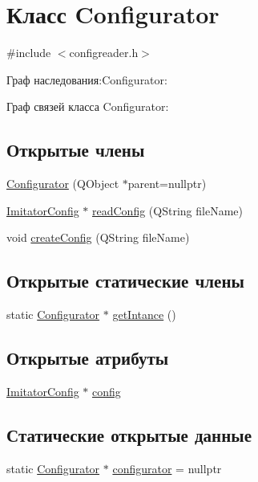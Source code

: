 \hypertarget{class_configurator}{}\section{Класс Configurator}
\label{class_configurator}


{\ttfamily \#include $<$configreader.\+h$>$}



Граф наследования\+:Configurator\+:


Граф связей класса Configurator\+:
\subsection*{Открытые члены}
\begin{DoxyCompactItemize}
\item 
\hyperlink{class_configurator_ac0dcebf9bc248dd7473ee442a6822ca3}{Configurator} (Q\+Object $\ast$parent=nullptr)
\item 
\hyperlink{class_imitator_config}{Imitator\+Config} $\ast$ \hyperlink{class_configurator_a400f7c5c3362fcab86051b014e894544}{read\+Config} (Q\+String file\+Name)
\item 
void \hyperlink{class_configurator_a6afc1da57117b7b9bad4dfefe98e8d63}{create\+Config} (Q\+String file\+Name)
\end{DoxyCompactItemize}
\subsection*{Открытые статические члены}
\begin{DoxyCompactItemize}
\item 
static \hyperlink{class_configurator}{Configurator} $\ast$ \hyperlink{class_configurator_a7138afa6d06c32b2e43495d108741c9f}{get\+Intance} ()
\end{DoxyCompactItemize}
\subsection*{Открытые атрибуты}
\begin{DoxyCompactItemize}
\item 
\hyperlink{class_imitator_config}{Imitator\+Config} $\ast$ \hyperlink{class_configurator_ab443cd9fb6f7abff1c05f76689ae469a}{config}
\end{DoxyCompactItemize}
\subsection*{Статические открытые данные}
\begin{DoxyCompactItemize}
\item 
static \hyperlink{class_configurator}{Configurator} $\ast$ \hyperlink{class_configurator_a7ec0953cb82dd1ac0c9e0cf358a9ad8c}{configurator} = nullptr
\end{DoxyCompactItemize}


